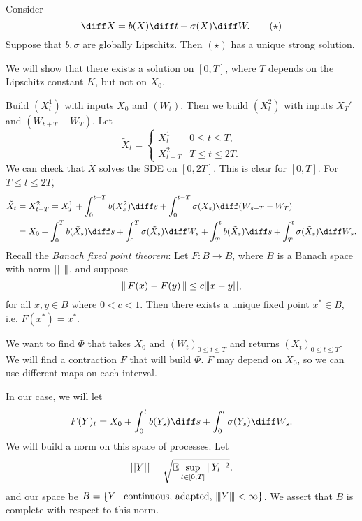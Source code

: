 \documentclass[12pt]{article}
\newcommand{\vertiii}[1]{{\left\vert\kern-0.25ex\left\vert\kern-0.25ex\left\vert #1 \right\vert\kern-0.25ex\right\vert\kern-0.25ex\right\vert}}
\begin{document}
\begin{theorem}[It\^o]
	Consider
	\[
		\diff X = b(X) \diff t + \sigma(X) \diff W. \tag{$\star$}
	\]
	Suppose that $b, \sigma$ are globally Lipschitz. Then $(\star)$ has a unique strong solution.
\end{theorem}

\begin{proofbox}
	We will show that there exists a solution on $[0, T]$, where $T$ depends on the Lipschitz constant $K$, but not on $X_0$.

	Build $(X_t^1)$ with inputs $X_0$ and $(W_t)$. Then we build $(X^2_t)$ with inputs $X_T'$ and $(W_{t + T} - W_T)$. Let
	\[
	\tilde X_t =
	\begin{cases}
		X^1_t & 0 \leq t \leq T, \\
		X^2_{t - T} & T \leq t \leq 2T.
	\end{cases}
	\]
	We can check that $\tilde X$ solves the SDE on $[0, 2T]$. This is clear for $[0, T]$. For $T \leq t \leq 2T$,
	\begin{align*}
		\tilde X_t &= X^2_{t - T} = X^1_T + \int_0^{t - T} b(X^2_{s}) \diff s + \int_0^{t - T} \sigma(X_{s}) \diff (W_{s + T} - W_T) \\
			   &= X_0 + \int_0^{T} b(\tilde X_s) \diff s + \int_0^{T} \sigma(\tilde X_s) \diff W_s + \int_{T}^{t} b(\tilde X_s) \diff s + \int_T^{t} \sigma(\tilde X_s) \diff W_s.
	\end{align*}
	Recall the \emph{Banach fixed point theorem}: Let $F : B \to B$, where $B$ is a Banach space with norm $\vertiii{\cdot}$, and suppose
	 \[
		 \vertiii{F(x) - F(y)} \leq c \vertiii{x - y},
	\]
	for all $x, y \in B$ where $0 < c < 1$. Then there exists a unique fixed point $x^{\ast} \in B$, i.e. $F(x^{\ast}) = x^{\ast}$.

	We want to find $\Phi$ that takes $X_0$ and $(W_t)_{0 \leq t \leq T}$ and returns $(X_t)_{0 \leq t \leq T}$. We will find a contraction $F$ that will build $\Phi$. $F$ may depend on $X_0$, so we can use different maps on each interval.

	In our case, we will let
	\[
	F(Y)_t = X_0 + \int_0^{t} b(Y_s) \diff s + \int_0^{t} \sigma(Y_s) \diff W_s.
	\]
	We will build a norm on this space of processes. Let
	\[
		\vertiii{Y} = \sqrt{\mathbb{E} \sup_{t \in [0, T]} \|Y_t\|^2},
	\]
	and our space be $B = \{Y \mid \text{continuous, adapted, } \vertiii{Y} < \infty\}$. We assert that $B$ is complete with respect to this norm.


\end{proofbox}
\end{document}
